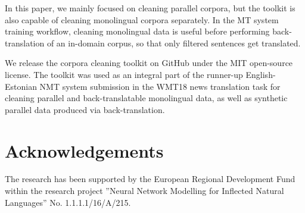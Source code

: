 \documentclass{IOS-Book-Article}
\begin{document}
In this paper, we mainly focused on cleaning parallel corpora, but the toolkit is also capable of cleaning monolingual corpora separately. In the MT system training workflow, cleaning monolingual data is useful before performing back-translation of an in-domain corpus, so that only filtered sentences get translated.

We release the corpora cleaning toolkit on GitHub under the MIT open-source license. The toolkit was used as an integral part of the runner-up English-Estonian NMT system submission \cite{pinnisetal2018} in the WMT18 news translation task for cleaning parallel and back-translatable monolingual data, as well as synthetic parallel data produced via back-translation.


\section*{Acknowledgements}
\label{sec:acknowledgments}

The research has been supported by the European Regional Development Fund within the research project ”Neural Network Modelling for Inflected Natural Languages” No. 1.1.1.1/16/A/215.

\label{sec:ref}



\end{document}
